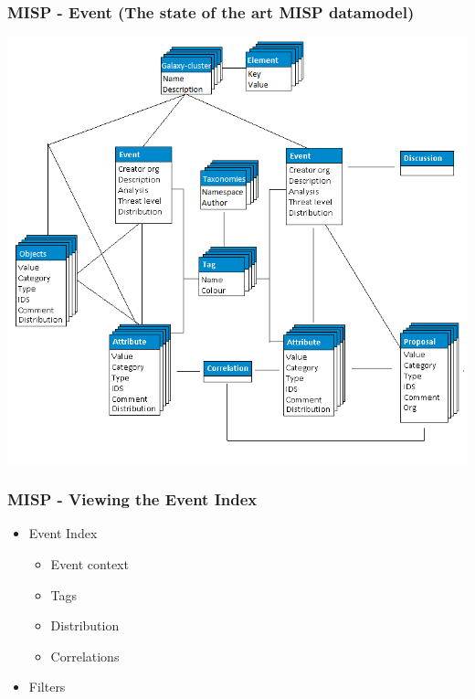 \begin{frame}
    \frametitle{MISP - Event (The state of the art MISP datamodel)}
    \includegraphics[scale=0.25]{screenshots/datamodel8.png}
\end{frame}

\begin{frame}
    \frametitle{MISP - Viewing the Event Index}
    \begin{itemize}
    \item Event Index
        \begin{itemize}
            \item Event context
            \item Tags
            \item Distribution
            \item Correlations
        \end{itemize}
    \item Filters
    \end{itemize}
\end{frame}

